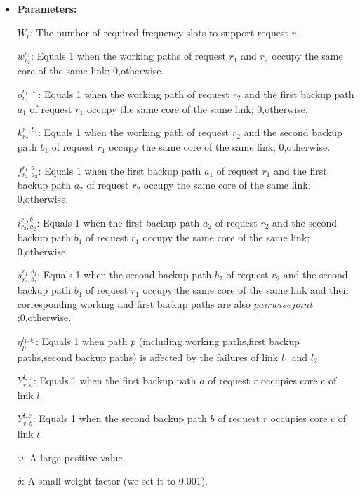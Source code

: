 \documentclass[a4paper,11pt]{report}
\begin{document}
\begin{itemize}
    \item \textbf{Parameters:}
        \item[$W^{}_r$:]The number of required frequency slots to support request $r$.
        \item[$w^{r_1}_{r_2}$:]Equals 1 when the working paths of request $r_1$ and $r_2$ occupy the same core of the same link; 0,otherwise.
        \item[$o^{r_1,a_1}_{r_2}$:]Equals 1 when the working path of request $r_2$ and the first backup path $a_1$ of request $r_1$ occupy the same core of the same link; 0,otherwise.
        \item[$k^{r_1,b_1}_{r_2}$:]Equals 1 when the working path of request $r_2$ and the second backup path $b_1$ of request $r_1$ occupy the same core of the same link; 0,otherwise.
         \item[$f^{r_1,a_1}_{r_2,a_2}$:]Equals 1 when the first backup path $a_1$ of request $r_1$ and the first backup path $a_2$ of request $r_2$ occupy the same core of the same link; 0,otherwise.
         \item[$i^{r_1,b^{}_1}_{r_2,a^{}_2}$:]Equals 1 when the first backup path $a_2$ of request $r_2$ and the second backup path $b_1$ of request $r_1$ occupy the same core of the same link; 0,otherwise.
         \item[$s^{r_1,b^{}_1}_{r_2,b^{}_2}$:]Equals 1 when the second backup path $b^{}_2$ of request $r_2$ and the second backup path $b^{}_1$ of request $r_1$ occupy the same core of the same link and their corresponding working and first backup paths are also $pairwise joint$;0,otherwise.
         \item[$\eta^{l_1,l_2}_p$:]Equals 1 when path $p$ (including working paths,first backup paths,second backup paths) is affected by the failures of link $l_1$ and $l_2$.
         \item[$Y^{l,c}_{r,a}$:]Equals 1 when the first backup path $a$ of request $r$ occupies core $c$ of link $l$.
         \item[$Y^{l,c}_{r,b}$:]Equals 1 when the second backup path $b$ of request $r$ occupies core $c$ of link $l$.
         \item[$\omega$:]A large positive value.
         \item[$\delta$:]A small weight factor (we set it to 0.001).
\end{itemize}
\end{document}
